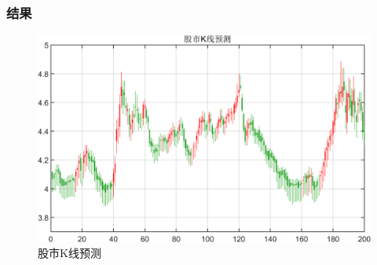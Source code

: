 \documentclass[aspectratio=169, 10pt, utf8, mathserif]{beamer}
\begin{document}
\begin{frame}
	\frametitle{结果}
\begin{figure}[H]
	\centering
	\includegraphics[width=0.65\linewidth]{pic/screenshot029}
	\caption{股市K线预测}
	\label{fig:screenshot029}
\end{figure}
\end{frame}	



	\begin{frame}
		\heiti {}
	\end{frame}
\end{document}
